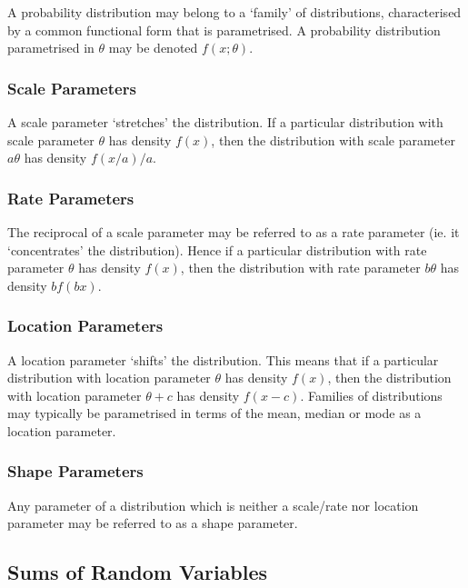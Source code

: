 \documentclass[11pt]{report} %
\begin{document}
A probability distribution may belong to a `family' of distributions, characterised by a common functional form that is parametrised. A probability distribution parametrised in $\theta$ may be denoted $f\left(x; \theta\right)$.

\subsubsection{Scale Parameters}

A scale parameter `stretches' the distribution. If a particular distribution with scale parameter $\theta$ has density $f\left(x\right)$, then the distribution with scale parameter $a\theta$ has density $f\left(x/a\right)/a$.

\subsubsection{Rate Parameters}

The reciprocal of a scale parameter may be referred to as a rate parameter (ie. it `concentrates' the distribution). Hence if a particular distribution with rate parameter $\theta$ has density $f\left(x\right)$, then the distribution with rate parameter $b\theta$ has density $bf\left(bx\right)$.

\subsubsection{Location Parameters}

A location parameter `shifts' the distribution. This means that if a particular distribution with location parameter $\theta$ has density $f\left(x\right)$, then the distribution with location parameter $\theta + c$ has density $f\left(x - c\right)$. Families of distributions may typically be parametrised in terms of the mean, median or mode as a location parameter. 

\subsubsection{Shape Parameters}

Any parameter of a distribution which is neither a scale/rate nor location parameter may be referred to as a shape parameter.

\subsection{Sums of Random Variables}
\end{document}
